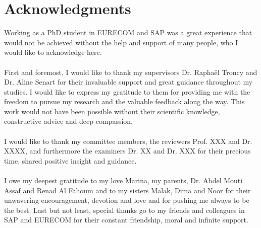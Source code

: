 \chapter*{Acknowledgments}

Working as a PhD student in EURECOM and SAP was a great experience that would not be achieved without the help and support of many people, who I would like to acknowledge here.
\\
\\
First and foremost, I would like to thank my supervisors Dr. Rapha\"el Troncy and Dr. Aline Senart for their invaluable support and great guidance throughout my studies. I would like to express my gratitude to them for providing me with the freedom to pursue my research and the valuable feedback along the way. This work would not have been possible without their scientific knowledge, constructive advice and deep compassion.
\\
\\
I would like to thank my committee members, the reviewers Prof. XXX  and Dr. XXXX, and furthermore the examiners Dr. XX and Dr. XXX for their precious time, shared positive insight and guidance.
\\
\\
I owe my deepest gratitude to my love Marina, my parents, Dr. Abdel Mouti Assaf and Renad Al Fahoum and to my sisters Malak, Dima and Noor for their unwavering encouragement, devotion and love and for pushing me always to be the best.  Last but not least, special thanks go to my friends and colleagues in SAP and EURECOM for their constant friendship, moral and infinite support.
